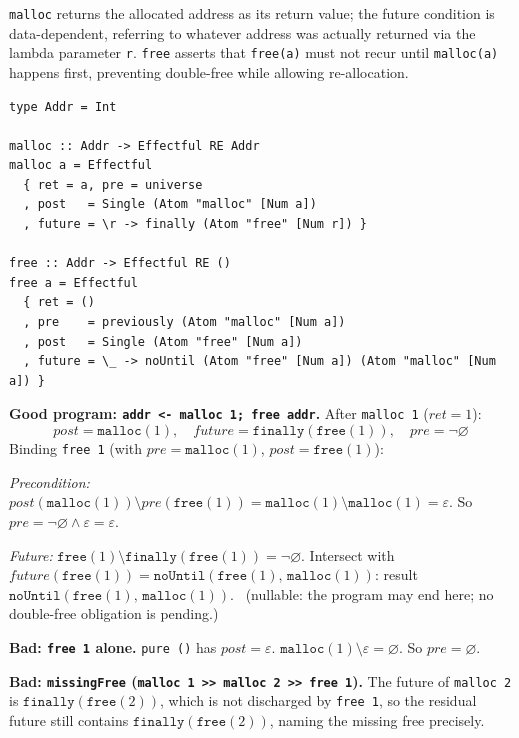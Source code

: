 \documentclass[acmsmall,screen]{acmart}
\newcommand{\pre}{\mathit{pre}}
\newcommand{\post}{\mathit{post}}
\newcommand{\fut}{\mathit{future}}
\newcommand{\ret}{\mathit{ret}}
\newcommand{\finally}[1]{\mathtt{finally}(#1)}
\newcommand{\noUntil}[2]{\mathtt{noUntil}(#1,\,#2)}
\newcommand{\univ}{\neg\varnothing}
\begin{document}
\lstinline{malloc} returns the allocated address as its return value;
the future condition is data-dependent, referring to whatever address
was actually returned via the lambda parameter \lstinline{r}.
\lstinline{free} asserts that \lstinline{free(a)} must not recur
until \lstinline{malloc(a)} happens first, preventing double-free while
allowing re-allocation.

\begin{lstlisting}
type Addr = Int

malloc :: Addr -> Effectful RE Addr
malloc a = Effectful
  { ret = a, pre = universe
  , post   = Single (Atom "malloc" [Num a])
  , future = \r -> finally (Atom "free" [Num r]) }

free :: Addr -> Effectful RE ()
free a = Effectful
  { ret = ()
  , pre    = previously (Atom "malloc" [Num a])
  , post   = Single (Atom "free" [Num a])
  , future = \_ -> noUntil (Atom "free" [Num a]) (Atom "malloc" [Num a]) }
\end{lstlisting}

\noindent\textbf{Good program: \lstinline{addr <- malloc 1; free addr}.}
After \lstinline{malloc 1} ($\ret = 1$):
\[
  \post = \mathtt{malloc}(1),\quad
  \fut  = \finally{\mathtt{free}(1)},\quad
  \pre  = \univ
\]
Binding \lstinline{free 1} (with $\pre = \mathtt{malloc}(1)$, $\post =
\mathtt{free}(1)$):

\textit{Precondition:}
$\post(\mathtt{malloc}(1)) \setminus \pre(\mathtt{free}(1))
= \mathtt{malloc}(1) \setminus \mathtt{malloc}(1) = \varepsilon$.
So $\pre = \univ \wedge \varepsilon = \varepsilon$.\ \checkmark

\textit{Future:}
$\mathtt{free}(1) \setminus \finally{\mathtt{free}(1)} = \univ$.
Intersect with $\fut(\mathtt{free}(1)) = \noUntil{\mathtt{free}(1)}{\mathtt{malloc}(1)}$:
result $\noUntil{\mathtt{free}(1)}{\mathtt{malloc}(1)}$.\ \checkmark
(nullable: the program may end here; no double-free obligation is pending.)

\noindent\textbf{Bad: \lstinline{free 1} alone.}
\lstinline{pure ()} has $\post = \varepsilon$.
$\mathtt{malloc}(1) \setminus \varepsilon = \varnothing$.
So $\pre = \varnothing$.\ \texttimes

\noindent\textbf{Bad: \lstinline{missingFree} (\lstinline{malloc 1 >> malloc 2 >> free 1}).}
The future of \lstinline{malloc 2} is $\finally{\mathtt{free}(2)}$,
which is not discharged by \lstinline{free 1}, so the residual future
still contains $\finally{\mathtt{free}(2)}$, naming the missing free precisely.
\end{document}
